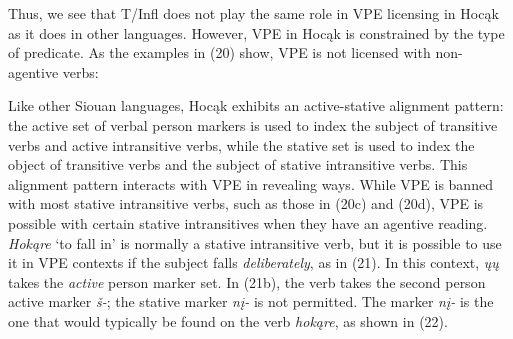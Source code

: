 \documentclass[output=paper]{LSP/langsci}
\begin{document}
Thus, we see that T/Infl does not play the same role in VPE licensing in Hocąk as it does in other languages. However, VPE in Hocąk is constrained by the type of predicate. As the examples in (20) show, VPE is not licensed with non-agentive verbs:


\begin{exe}
\ex
\begin{xlist}
\end{xlist}
\end{exe}

Like other Siouan languages, Hocąk exhibits an active-stative alignment pattern: the active set of verbal person markers is used to index the subject of transitive verbs and active intransitive verbs, while the stative set is used to index the object of transitive verbs and the subject of stative intransitive verbs. This alignment pattern interacts with VPE in revealing ways. While VPE is banned with most stative intransitive verbs, such as those in (20c) and (20d), VPE is possible with certain stative intransitives when they have an agentive reading. \emph{Hokąre} `to fall in' is normally a stative intransitive verb, but it is possible to use it in VPE contexts if the subject falls \emph{deliberately}, as in (21). In this context, \emph{ųų} takes the \emph{active} person marker set. In (21b), the verb takes the second person active marker \emph{š-}; the stative marker \emph{nį-} is not permitted. The marker \emph{nį-} is the one that would typically be found on the verb \emph{hokąre}, as shown in (22).
\end{document}
